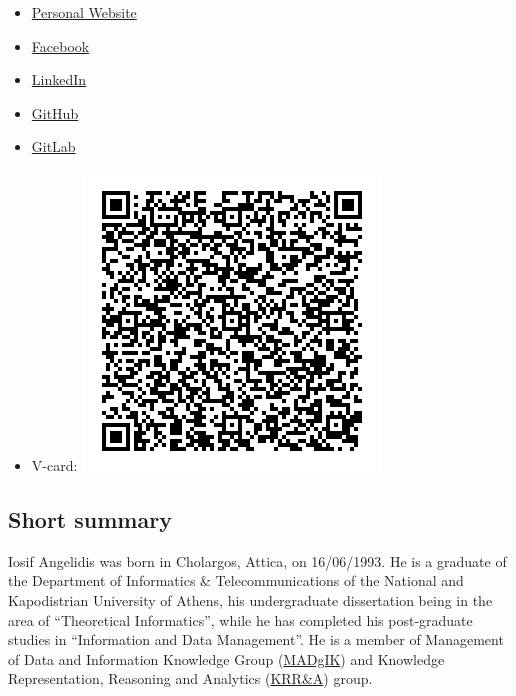 \documentclass[a4paper,oneside,11pt]{article}
\begin{document}
\begin{itemize}

\item \href{https://iosang.github.io}{Personal Website}

\item \href{https://www.facebook.com/metimdjai}{Facebook}

\item \href{https://www.linkedin.com/in/iosif-angelidis/}{LinkedIn}

\item \href{https://github.com/metimdjai}{GitHub}

\item \href{https://gitlab.com/metimdjai}{GitLab}

\item V-card: \includegraphics[scale=0.5]{qr.png}%

\end{itemize}

\newpage

\subsection*{Short summary}

\begin{sloppypar}
	Iosif Angelidis was born in Cholargos, Attica, on 16/06/1993. He is a graduate of the Department
	of Informatics \& Telecommunications of the National and Kapodistrian University of Athens, his undergraduate 
	dissertation being in the area of ``Theoretical Informatics'', while he has completed his post-graduate studies in ``Information and Data
	Management''. He is a member of Management of Data and Information Knowledge Group
	(\href{http://www.madgik.di.uoa.gr}{MADgIK}) and Knowledge Representation, Reasoning and
	Analytics (\href{http://kr.di.uoa.gr/}{KRR\&A}) group.
\end{sloppypar}
\end{document}
